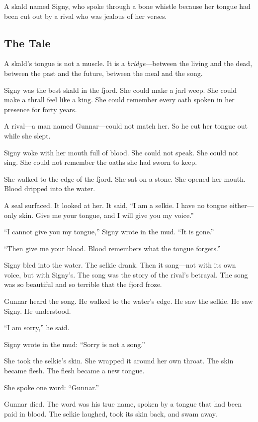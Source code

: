 \documentclass[9pt,a5paper]{extbook}
\begin{document}
A skald named Signy, who spoke through a bone whistle because her tongue had been cut out by a rival who was jealous of her verses.

\subsection*{The Tale}

A skald's tongue is not a muscle. It is a \textit{bridge}---between the living and the dead, between the past and the future, between the meal and the song.

Signy was the best skald in the fjord. She could make a jarl weep. She could make a thrall feel like a king. She could remember every oath spoken in her presence for forty years.

A rival---a man named Gunnar---could not match her. So he cut her tongue out while she slept.

Signy woke with her mouth full of blood. She could not speak. She could not sing. She could not remember the oaths she had sworn to keep.

She walked to the edge of the fjord. She sat on a stone. She opened her mouth. Blood dripped into the water.

A seal surfaced. It looked at her. It said, ``I am a selkie. I have no tongue either---only skin. Give me your tongue, and I will give you my voice.''

``I cannot give you my tongue,'' Signy wrote in the mud. ``It is gone.''

``Then give me your blood. Blood remembers what the tongue forgets.''

Signy bled into the water. The selkie drank. Then it sang---not with its own voice, but with Signy's. The song was the story of the rival's betrayal. The song was so beautiful and so terrible that the fjord froze.

Gunnar heard the song. He walked to the water's edge. He saw the selkie. He saw Signy. He understood.

``I am sorry,'' he said.

Signy wrote in the mud: ``Sorry is not a song.''

She took the selkie's skin. She wrapped it around her own throat. The skin became flesh. The flesh became a new tongue.

She spoke one word: ``Gunnar.''

Gunnar died. The word was his true name, spoken by a tongue that had been paid in blood. The selkie laughed, took its skin back, and swam away.
\end{document}
